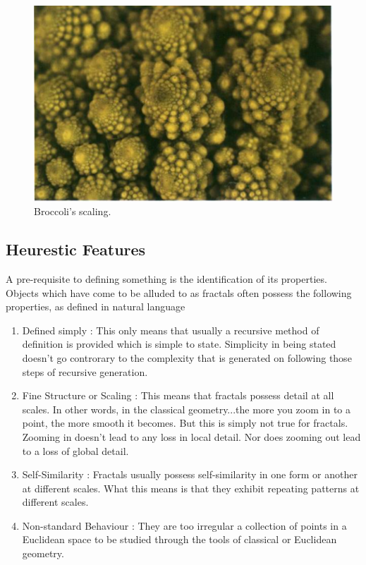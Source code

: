 \begin{figure}[h!]
  \includegraphics[width=\linewidth]{Pictures/broccoli_zoomed.png}
  \caption{Broccoli's scaling.}
  \label{fig:broccoli_zoomed}
\end{figure}
\subsection{Heurestic Features}
A pre-requisite to defining something is the identification of its properties.
Objects which have come to be alluded to as fractals often possess the following
properties, as defined in natural language
\begin{enumerate}
    \item Defined simply : This only means that usually a recursive method of
        definition is provided which is simple to state. Simplicity in being
        stated doesn't go controrary to the complexity that is generated on
        following those steps of recursive generation.
    \item Fine Structure or Scaling : This means that fractals possess detail at
        all
        scales. In other words, in the classical geometry...the more you zoom in
        to a point, the more smooth it becomes. But this is simply not true for
        fractals. Zooming in doesn't lead to any loss in local detail. Nor does
        zooming out lead to a loss of global detail.
    \item Self-Similarity : Fractals usually possess self-similarity in one form
        or another at different scales. What this means is that they exhibit
        repeating patterns at different scales.
    \item Non-standard Behaviour : 
        They are too irregular a collection of points in a Euclidean space to
        be studied through the tools of classical or Euclidean geometry.
\end{enumerate}


